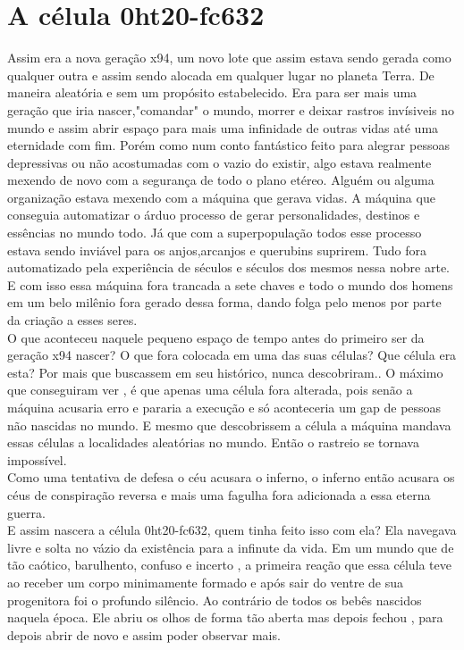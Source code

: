 \documentclass{book}
\begin{document}
\chapter{A célula 0ht20-fc632 }
Assim era a nova geração x94, um novo lote que assim estava sendo gerada como qualquer outra e assim sendo alocada em qualquer lugar no planeta Terra. De maneira aleatória e sem um propósito estabelecido. Era para ser mais uma geração que iria nascer,"comandar" o mundo, morrer e deixar rastros invísiveis no mundo e assim abrir espaço para mais uma infinidade de outras vidas até uma eternidade com fim. Porém como num conto fantástico feito para alegrar pessoas depressivas ou não acostumadas com o vazio do existir, algo estava realmente mexendo de novo com a segurança de todo o plano etéreo. Alguém ou alguma organização estava mexendo com a máquina que gerava vidas. A máquina que conseguia automatizar o árduo processo de gerar personalidades, destinos e essências no mundo todo. Já que com a superpopulação todos esse processo estava sendo inviável para os anjos,arcanjos e querubins suprirem. Tudo fora automatizado pela experiência de séculos e séculos dos mesmos nessa nobre arte. E com isso essa máquina fora trancada a sete chaves e todo o mundo dos homens em um belo milênio fora gerado dessa forma, dando folga pelo menos por parte da criação a esses seres.\\
O que aconteceu naquele pequeno espaço de tempo antes do primeiro ser da geração x94 nascer? O que fora colocada em uma das suas células? Que célula era esta? Por mais que buscassem em seu histórico, nunca descobriram.. O máximo que conseguiram ver , é que apenas uma célula fora alterada, pois senão a máquina acusaria erro e pararia a execução e só aconteceria um gap de pessoas não nascidas no mundo. E mesmo que descobrissem a célula a máquina mandava essas células a localidades aleatórias no mundo. Então o rastreio se tornava impossível. \\
Como uma tentativa de defesa o céu acusara o inferno, o inferno então acusara os céus de conspiração reversa e mais uma fagulha fora adicionada a essa eterna guerra.\\
E assim nascera a célula 0ht20-fc632, quem tinha feito isso com ela? Ela navegava livre e solta no vázio da existência para a infinute da vida. Em um mundo que de tão caótico, barulhento, confuso e incerto , a primeira reação que essa célula teve ao receber um corpo minimamente formado e após sair do ventre de sua progenitora foi o profundo silêncio. Ao contrário de todos os bebês nascidos naquela época. Ele abriu os olhos de forma tão aberta mas depois fechou , para depois abrir de novo e assim poder observar mais. \\
\end{document}
